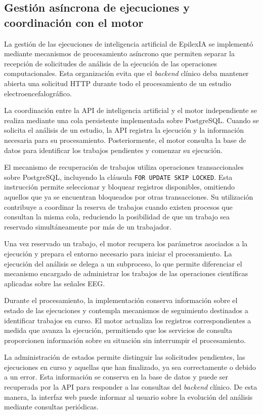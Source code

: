 \subsection{Gestión asíncrona de ejecuciones y coordinación con el motor}

La gestión de las ejecuciones de inteligencia
artificial de EpilexIA se implementó mediante
mecanismos de procesamiento asíncrono que
permiten separar la recepción de solicitudes
de análisis de la ejecución de las operaciones
computacionales. Esta organización evita
que el \textit{backend} clínico deba mantener abierta
una solicitud HTTP durante todo el procesamiento
de un estudio electroencefalográfico.

La coordinación entre la API de inteligencia
artificial y el motor independiente se realiza
mediante una cola persistente implementada
sobre PostgreSQL. Cuando se solicita el análisis
de un estudio, la API registra la ejecución
y la información necesaria para su procesamiento.
Posteriormente, el motor consulta la base
de datos para identificar los trabajos
pendientes y comenzar su ejecución.

El mecanismo de recuperación de trabajos
utiliza operaciones transaccionales sobre
PostgreSQL, incluyendo la cláusula
\texttt{FOR UPDATE SKIP LOCKED}. Esta
instrucción permite seleccionar y bloquear
registros disponibles, omitiendo aquellos
que ya se encuentran bloqueados por otras
transacciones. Su utilización contribuye
a coordinar la reserva de trabajos cuando
existen procesos que consultan la misma
cola, reduciendo la posibilidad de que
un trabajo sea reservado simultáneamente
por más de un trabajador.

Una vez reservado un trabajo, el motor
recupera los parámetros asociados a la
ejecución y prepara el entorno necesario
para iniciar el procesamiento. La ejecución
del análisis se delega a un subproceso,
lo que permite diferenciar el mecanismo
encargado de administrar los trabajos
de las operaciones científicas aplicadas
sobre las señales EEG.

Durante el procesamiento, la implementación
conserva información sobre el estado de
las ejecuciones y contempla mecanismos
de seguimiento destinados a identificar
trabajos en curso. El motor actualiza
los registros correspondientes a medida
que avanza la ejecución, permitiendo
que los servicios de consulta proporcionen
información sobre su situación sin
interrumpir el procesamiento.

La administración de estados permite
distinguir las solicitudes pendientes,
las ejecuciones en curso y aquellas que
han finalizado, ya sea correctamente
o debido a un error. Esta información
se conserva en la base de datos y puede
ser recuperada por la API para responder
a las consultas del \textit{backend} clínico.
De esta manera, la interfaz web puede
informar al usuario sobre la evolución
del análisis mediante consultas periódicas.

